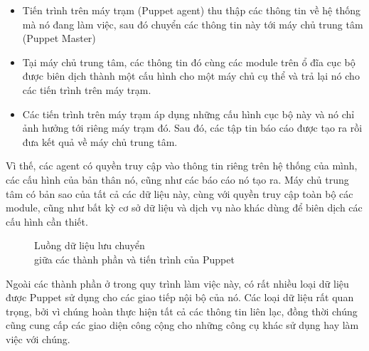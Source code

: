 \begin{itemize}
\item Tiến trình trên máy trạm (Puppet agent) thu thập các thông tin về hệ thống mà nó đang làm việc, sau đó chuyển các thông tin này tới máy chủ trung tâm (Puppet Master)

\item Tại máy chủ trung tâm, các thông tin đó cùng các module trên ổ đĩa cục bộ được biên dịch thành một cấu hình cho một máy chủ cụ thể và trả lại nó cho các tiến trình trên máy trạm.

\item Các tiến trình trên máy trạm áp dụng những cấu hình cục bộ này và nó chỉ ảnh hưởng tới riêng máy trạm đó. Sau đó, các tập tin báo cáo được tạo ra rồi đưa kết quả về máy chủ trung tâm.
\end{itemize}

Vì thế, các agent có quyền truy cập vào thông tin riêng trên hệ thống của mình, các cấu hình của bản thân nó, cũng như các báo cáo nó tạo ra. Máy chủ trung tâm có bản sao của tất cả các dữ liệu này, cùng với quyền truy cập toàn bộ các module, cũng như bất kỳ cơ sở dữ liệu và dịch vụ nào khác dùng để biên dịch các cấu hình cần thiết.

\begin{figure}[h!]
    \begin{center}
    \end{center}
    \caption{Luồng dữ liệu lưu chuyển \\ giữa các thành phần và tiến trình của Puppet}
    \label{fig:puppet_timing_diagram}
\end{figure}

Ngoài các thành phần ở trong quy trình làm việc này, có rất nhiều loại dữ liệu được Puppet sử dụng cho các giao tiếp nội bộ của nó. Các loại dữ liệu rất quan trọng, bởi vì chúng hoàn thực hiện tất cả các thông tin liên lạc, đồng thời chúng cũng cung cấp các giao diện công cộng cho những công cụ khác sử dụng hay làm việc với chúng.

